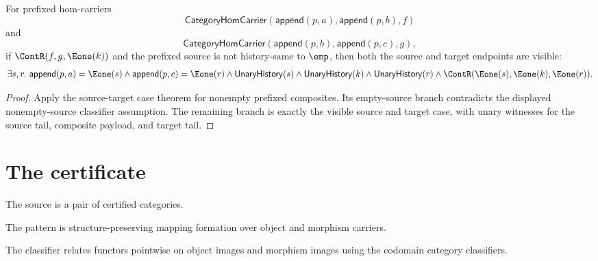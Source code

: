 \begin{theorem}
\label{thm:functor-prefix-hom-carrier-comp-nonempty-result-source-visible}
For prefixed hom-carriers
$$
\mathsf{CategoryHomCarrier}(\mathsf{append}(p,a),\mathsf{append}(p,b),f)
$$
and
$$
\mathsf{CategoryHomCarrier}(\mathsf{append}(p,b),\mathsf{append}(p,c),g),
$$
if $\ContR(f,g,\Eone(k))$ and the prefixed source is not history-same to
$\emp$, then both the source and target endpoints are visible:
$$
\exists s,r.\ \mathsf{append}(p,a)=\Eone(s)\wedge
\mathsf{append}(p,c)=\Eone(r)\wedge
\mathsf{UnaryHistory}(s)\wedge\mathsf{UnaryHistory}(k)\wedge
\mathsf{UnaryHistory}(r)\wedge
\ContR(\Eone(s),\Eone(k),\Eone(r)).
$$
\end{theorem}
\begin{proof}
Apply the source-target case theorem for nonempty prefixed composites. Its
empty-source branch contradicts the displayed nonempty-source classifier
assumption. The remaining branch is exactly the visible source and target
case, with unary witnesses for the source tail, composite payload, and target
tail.
\end{proof}

\section{The certificate}

\begin{definition}
\label{def:functor-source-specification}
The source is a pair of certified categories.
\end{definition}

\begin{definition}
\label{def:functor-pattern-specification}
The pattern is structure-preserving mapping formation over object and morphism carriers.
\end{definition}

\begin{definition}
\label{def:functor-classifier-specification}
The classifier relates functors pointwise on object images and morphism images using the codomain category classifiers.
\end{definition}

